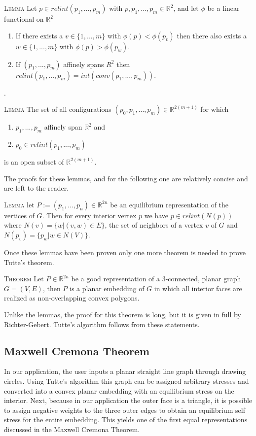 \documentclass[11pt]{article}
\newcommand{\R}{\mathbb{R}}
\begin{document}
\textsc{Lemma} Let $p \in relint(p_1,...,p_m)$ with $p, p_1,...,p_m \in \R^2$, and let $\phi$ be a linear functional on $\R^2$
	\begin{enumerate}
		\item If there exists a $v \in \{1,...,m\}$ with $\phi(p) < \phi(p_v)$ then there also exists a $w \in \{1,...,m\}$ with $\phi(p) > \phi(p_w)$.
		\item If $(p_1,...,p_m)$ affinely spans $R^2$ then $relint(p_1,...,p_m) = int(conv(p_1,...,p_m))$.
	\end{enumerate} .

\textsc{Lemma} The set of all configurations $(p_0, p_1,...,p_m) \in \R^{2(m+1)}$ for which 
	\begin{enumerate}
		\item $p_1,...,p_m$ affinely span $\R^2$ and
		\item $p_0 \in relint(p_1,...,p_m)$
	\end{enumerate}
	is an open subset of $\R^{2(m+1)}$.

The proofs for these lemmas, and for the following one are relatively concise and are left to the reader.

\textsc{Lemma} let $P:=(p_1,...,p_n) \in \R^{2n}$ be an equilibrium representation of the vertices of $G$. Then for every interior vertex $p$ we have $p \in relint(N(p))$ where $N(v) = \{w | (v,w) \in E\}$, the set of neighbors of a vertex $v$ of $G$ and $N(p_v) = \{p_w | w \in N(V)\}$.

Once these lemmas have been proven only one more theorem is needed to prove Tutte's theorem.

\textsc{Theorem} Let $P \in \R^{2n}$ be a good representation of a 3-connected, planar graph $G = (V,E)$, then $P$ is a planar embedding of $G$ in which all interior faces are realized as non-overlapping convex polygons.

Unlike the lemmas, the proof for this theorem is long, but it is given in full by Richter-Gebert. Tutte's algorithm follows from these statements.

\subsection{Maxwell Cremona Theorem}
In our application, the user inputs a planar straight line graph through drawing circles. Using Tutte's algorithm this graph can be assigned arbitrary stresses and converted into a convex planar embedding with an equilibrium stress on the interior. Next, because in our application the outer face is a triangle, it is possible to assign negative weights to the three outer edges to obtain an equilibrium self stress for the entire embedding. This yields one of the first equal representations discussed in the Maxwell Cremona Theorem.
\end{document}
